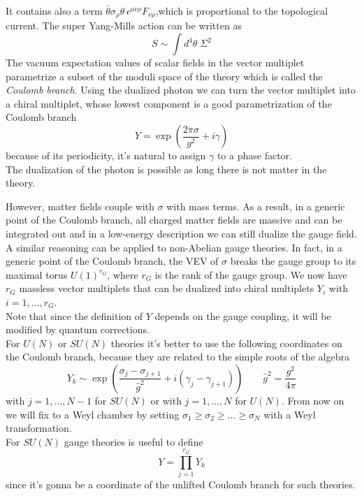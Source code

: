 It contains also a term $ \bar{\theta} \sigma_{\rho} \theta \, \epsilon^{\mu \nu \rho} F_{\nu \rho}$,which is proportional to the topological current.
The super Yang-Mills action can be written as
\begin{equation}
S \sim \int d^4 \theta \; \Sigma^2
\end{equation}
The  vacuum expectation values of scalar fields in the vector multiplet parametrize a subset of the moduli space of the theory which is called the \emph{Coulomb branch}.
Using the dualized photon we can turn the vector multiplet into a chiral multiplet, whose lowest component is a good parametrization of the Coulomb branch 
\begin{equation}
 Y = \exp{ \left( \frac{2 \pi \sigma}{g^2} + i \gamma \right)}
\end{equation}
because of its periodicity, it's natural to assign $\gamma$ to a phase factor.\\
The dualization of the photon is possible as long there is not matter in the theory.

However, matter fields couple with $\sigma$ with mass terms. As a result, in a generic point of the Coulomb branch, all charged matter fields are massive and can be integrated out and in a low-energy description we can still dualize the gauge field.\\
A similar reasoning can be applied to non-Abelian gauge theories.
In fact, in a generic point of the Coulomb branch, the VEV of $\sigma$ breaks the gauge group to its maximal torus $U(1)^{r_G}$, where $r_G$ is the rank of the gauge group. 
We now have $r_G$ massless vector multiplets that can be dualized into chiral multiplets $Y_i$ with $i=1,\dotsc,r_G$.
\\
Note that since the definition of $Y$ depends on the gauge coupling, it will be modified by quantum corrections.
\\
For $U(N)$ or $ SU(N)$ theories it's better to use the following coordinates on the Coulomb branch, because they are related to the simple roots of the algebra
\begin{equation}
 Y_k \sim \exp \left( \frac{\sigma_j- \sigma_{j+1}}{\hat{g}^2} + i ( \gamma_j - \gamma_{j+1} )   \right) \qquad \hat{g}^2 =  \frac{g^2}{4 \pi}
\label{eqn:Y_def_sun_theories}
\end{equation}
with $j = 1, \dotsc , N -1$ for $SU(N)$ or with $ j = 1, \dotsc, N$ for $U(N)$.
From now on we will fix to a Weyl chamber by setting $\sigma_1 \geq \sigma_2 \geq \dots \geq \sigma_N$ with a Weyl transformation.\\
For $SU(N)$ gauge theories is useful to define
\begin{equation}
 Y = \prod_{j=1}^{r_G} Y_k
 \label{eqn:definition_of_Y_sun}
\end{equation}
since it's gonna be a coordinate of the unlifted Coulomb branch for such theories.














